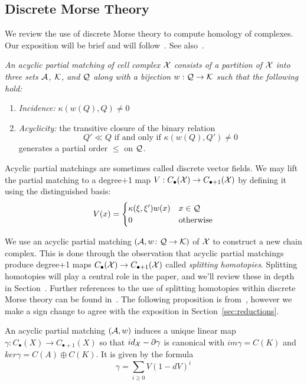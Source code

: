

\subsection{Discrete Morse Theory}
We review the use of discrete Morse theory to compute homology of complexes. Our exposition will be brief and will follow~\cite{focm}.  See also~\cite{sko, real}.

\begin{defn}
{\em
An {\em acyclic partial matching} of cell complex ${\mathcal X}$ consists of a partition of ${\mathcal X}$ into three sets ${\mathcal A}$, ${\mathcal K}$, and ${\mathcal Q}$ along with a bijection $w:{\mathcal Q}\to {\mathcal K}$ such that the following hold:
 \begin{enumerate}
 \item {\em Incidence:} $\kappa(w(Q),Q)\neq 0$
 \item {\em Acyclicity:} the transitive closure of the binary relation $$Q' \ll Q \text{ if and only if } \kappa (w(Q),Q')\neq 0$$
 generates a partial order $\leq$ on ${\mathcal Q}$.
 \end{enumerate}
 }
 \end{defn} 
 
 Acyclic partial matchings are sometimes called discrete vector fields.  We may lift the partial matching to a degree+1 map $V:C_\bullet ({\mathcal X})\to C_{\bullet+1}({\mathcal X})$ by defining it using the distinguished basis:
 \[
 V(x) = 
\begin{cases}
\kappa (\xi, \xi') w(x) & x\in {\mathcal Q} \\
0 & \text{otherwise}
\end{cases}
 \]
 
 We use an acyclic partial matching $({\mathcal A},w\colon{\mathcal Q}\to {\mathcal K})$ of ${\mathcal X}$ to construct a new chain complex. This is done through the observation that acyclic partial matchings produce degree+1 maps $C_\bullet({\mathcal X})\to C_{\bullet+1}({\mathcal X})$ called {\em splitting homotopies}.  Splitting homotopies will play a central role in the paper, and we'll review these in depth in Section~\cite{}.  Further references to the use of splitting homotopies within discrete Morse theory can be found in~\cite{sko}.  The following proposition is from~\cite{focm}, however we make a sign change to agree with the exposition in Section~\ref{sec:reductions}.
  
 \begin{prop}\label{prop:matchinghomotopy}
An acyclic partial matching $({\mathcal A},w)$ induces a unique linear map $\gamma:C_\bullet(X)\to C_{\bullet+1}(X)$ so that $id_{\mathcal X}-\partial \gamma$ is canonical with $im\gamma = C(K)$ and $ker\gamma = C(A)\oplus C(K)$.  It is given by the formula
\[
\gamma = \sum_{i\geq 0} V(1-dV)^i
\]
\end{prop}
 
